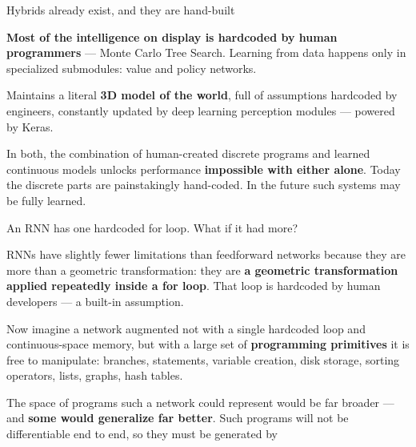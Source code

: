 \documentclass[aspectratio=169,11pt,t]{beamer}
\begin{document}
\begin{frame}[shrink=25]{Hybrids already exist, and they are hand-built}
\begin{minipage}[t]{0.494\textwidth}
\begin{icardaccent}
\textbf{Most of the intelligence on display is hardcoded by human programmers} --- Monte Carlo Tree Search. Learning from data happens only in specialized submodules: value and policy networks.
\end{icardaccent}
\end{minipage}%
\hfill
\begin{minipage}[t]{0.494\textwidth}
\begin{icardaccent}
Maintains a literal \textbf{3D model of the world}, full of assumptions hardcoded by engineers, constantly updated by deep learning perception modules --- powered by Keras.
\end{icardaccent}
\end{minipage}%
{\fontsize{9.4}{12.6}\selectfont\color{fg2}In both, the combination of human-created discrete programs and learned continuous models unlocks performance \textbf{impossible with either alone}. Today the discrete parts are painstakingly hand-coded. In the future such systems may be fully learned.\par}\vskip 4pt
\end{frame}

\begin{frame}[shrink=25]{An RNN has one hardcoded for loop. What if it had more?}
{\fontsize{9.4}{12.6}\selectfont\color{fg2}RNNs have slightly fewer limitations than feedforward networks because they are more than a geometric transformation: they are \textbf{a geometric transformation applied repeatedly inside a for loop}. That loop is hardcoded by human developers --- a built-in assumption.\par}\vskip 4pt
{\fontsize{9.4}{12.6}\selectfont\color{fg2}Now imagine a network augmented not with a single hardcoded loop and continuous-space memory, but with a large set of \textbf{programming primitives} it is free to manipulate:  branches,  statements, variable creation, disk storage, sorting operators, lists, graphs, hash tables.\par}\vskip 4pt
\begin{iband}[signal]
The space of programs such a network could represent would be far broader --- and \textbf{some would generalize far better}. Such programs will not be differentiable end to end, so they must be generated by 
\end{iband}
\end{frame}
\end{document}
